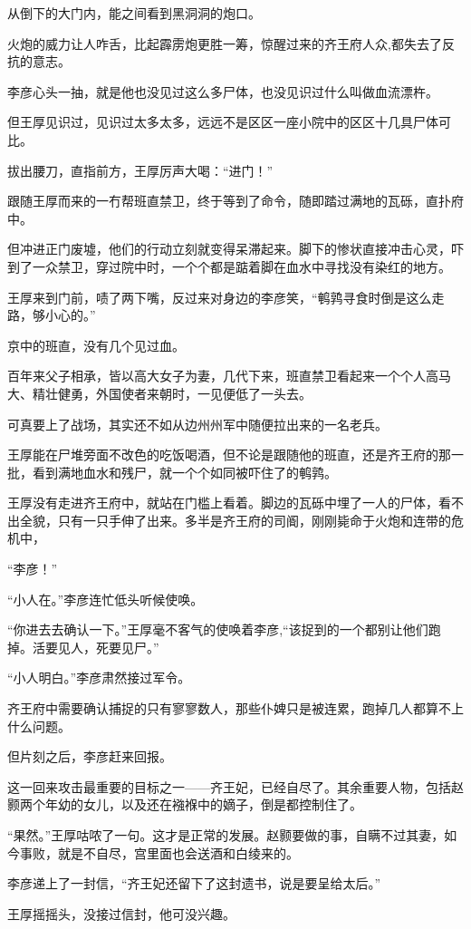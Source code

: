 从倒下的大门内，能之间看到黑洞洞的炮口。

火炮的威力让人咋舌，比起霹雳炮更胜一筹，惊醒过来的齐王府人众,都失去了反抗的意志。

李彦心头一抽，就是他也没见过这么多尸体，也没见识过什么叫做血流漂杵。

但王厚见识过，见识过太多太多，远远不是区区一座小院中的区区十几具尸体可比。

拔出腰刀，直指前方，王厚厉声大喝：“进门！”

跟随王厚而来的一冇帮班直禁卫，终于等到了命令，随即踏过满地的瓦砾，直扑府中。

但冲进正门废墟，他们的行动立刻就变得呆滞起来。脚下的惨状直接冲击心灵，吓到了一众禁卫，穿过院中时，一个个都是踮着脚在血水中寻找没有染红的地方。

王厚来到门前，啧了两下嘴，反过来对身边的李彦笑，“鹌鹑寻食时倒是这么走路，够小心的。”

京中的班直，没有几个见过血。

百年来父子相承，皆以高大女子为妻，几代下来，班直禁卫看起来一个个人高马大、精壮健勇，外国使者来朝时，一见便低了一头去。

可真要上了战场，其实还不如从边州州军中随便拉出来的一名老兵。

王厚能在尸堆旁面不改色的吃饭喝酒，但不论是跟随他的班直，还是齐王府的那一批，看到满地血水和残尸，就一个个如同被吓住了的鹌鹑。

王厚没有走进齐王府中，就站在门槛上看着。脚边的瓦砾中埋了一人的尸体，看不出全貌，只有一只手伸了出来。多半是齐王府的司阍，刚刚毙命于火炮和连带的危机中，

“李彦！”

“小人在。”李彦连忙低头听候使唤。

“你进去去确认一下。”王厚毫不客气的使唤着李彦,“该捉到的一个都别让他们跑掉。活要见人，死要见尸。”

“小人明白。”李彦肃然接过军令。

齐王府中需要确认捕捉的只有寥寥数人，那些仆婢只是被连累，跑掉几人都算不上什么问题。

但片刻之后，李彦赶来回报。

这一回来攻击最重要的目标之一——齐王妃，已经自尽了。其余重要人物，包括赵颢两个年幼的女儿，以及还在襁褓中的嫡子，倒是都控制住了。

“果然。”王厚咕哝了一句。这才是正常的发展。赵颢要做的事，自瞒不过其妻，如今事败，就是不自尽，宫里面也会送酒和白绫来的。

李彦递上了一封信，“齐王妃还留下了这封遗书，说是要呈给太后。”

王厚摇摇头，没接过信封，他可没兴趣。

